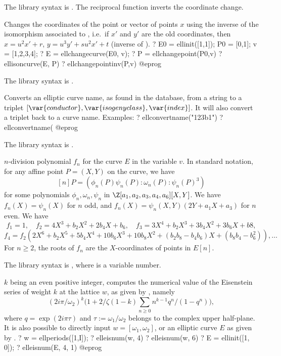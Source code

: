 The library syntax is .
The reciprocal function 
inverts the coordinate change.

\label{se:ellchangepointinv}
Changes the coordinates of the point or vector of points $x$ using
the inverse of the isomorphism associated to ,
i.e.~if $x'$ and $y'$ are the old coordinates, then $x=u^2x'+r$,
$y=u^3y'+su^2x'+t$ (inverse of ).
\bprog
? E0 = ellinit([1,1]); P0 = [0,1]; v = [1,2,3,4];
? E = ellchangecurve(E0, v);
? P = ellchangepoint(P0,v)
? ellisoncurve(E, P)
? ellchangepointinv(P,v)
@eprog

The library syntax is .

\label{se:ellconvertname}
Converts an elliptic curve name, as found in the  database,
from a string to a triplet $[\var{conductor}, \var{isogeny class},
\var{index}]$. It will also convert a triplet back to a curve name.
Examples:
\bprog
? ellconvertname("123b1")
? ellconvertname(%
@eprog

The library syntax is .

\label{se:elldivpol}
$n$-division polynomial $f_n$ for the curve $E$ in the
variable $v$. In standard notation, for any affine point $P = (X,Y)$ on the
curve, we have
$$[n]P = (\phi_n(P)\psi_n(P) : \omega_n(P) : \psi_n(P)^3)$$
for some polynomials $\phi_n,\omega_n,\psi_n$ in
$\Z[a_1,a_2,a_3,a_4,a_6][X,Y]$. We have $f_n(X) = \psi_n(X)$ for $n$ odd, and
$f_n(X) = \psi_n(X,Y) (2Y + a_1X+a_3)$ for $n$ even. We have
$$ f_1  = 1,\quad f_2 = 4X^3 + b_2X^2 + 2b_4 X + b_6, \quad f_3 = 3 X^4 + b_2 X^3 + 3b_4 X^2 + 3 b_6 X + b8, $$
$$ f_4 = f_2(2X^6 + b_2 X^5 + 5b_4 X^4 + 10 b_6 X^3 + 10 b_8 X^2 +
(b_2b_8-b_4b_6)X + (b_8b_4 - b_6^2)), \dots $$
For $n \geq 2$, the roots of $f_n$ are the $X$-coordinates of points in $E[n]$.

The library syntax is , where  is a variable number.

\label{se:elleisnum}
$k$ being an even positive integer, computes the numerical value of the
Eisenstein series of weight $k$ at the lattice $w$, as given by
, namely
$$
(2i \pi/\omega_2)^k
\Big(1 + 2/\zeta(1-k) \sum_{n\geq 0} n^{k-1}q^n / (1-q^n)\Big),
$$
where $q = \exp(2i\pi \tau)$ and $\tau:=\omega_1/\omega_2$ belongs to the
complex upper half-plane. It is also possible to directly input $w =
[\omega_1,\omega_2]$, or an elliptic curve $E$ as given by .
\bprog
? w = ellperiods([1,I]);
? elleisnum(w, 4)
? elleisnum(w, 6)
? E = ellinit([1, 0]);
? elleisnum(E, 4, 1)
@eprog

